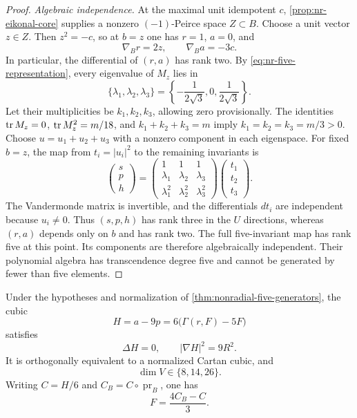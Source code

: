 \begin{proof}
\emph{Algebraic independence.}
At the maximal unit idempotent $c$,
\cref{prop:nr-eikonal-core} supplies a nonzero $(-1)$-Peirce space
$Z\subset B$. Choose a unit vector $z\in Z$. Then $z^2=-c$, so at
$b=z$ one has $r=1$, $a=0$, and
\[
 \nabla_B r=2z,\qquad \nabla_B a=-3c.
\]
In particular, the differential of $(r,a)$ has rank two.
By \eqref{eq:nr-five-representation}, every eigenvalue of $M_z$ lies in
\[
 \{\lambda_1,\lambda_2,\lambda_3\}
   =\left\{-\frac1{2\sqrt3},0,\frac1{2\sqrt3}\right\}.
\]
Let their multiplicities be $k_1,k_2,k_3$, allowing zero provisionally.
The identities $\operatorname{tr} M_z=0$, $\operatorname{tr} M_z^2=m/18$, and
$k_1+k_2+k_3=m$ imply $k_1=k_2=k_3=m/3>0$.
Choose $u=u_1+u_2+u_3$ with a nonzero component in each eigenspace.
For fixed $b=z$, the map from $t_i=|u_i|^2$ to the remaining invariants
is
\[
 \begin{pmatrix}s\\p\\h\end{pmatrix}
 =
 \begin{pmatrix}
  1&1&1\\
  \lambda_1&\lambda_2&\lambda_3\\
  \lambda_1^2&\lambda_2^2&\lambda_3^2
 \end{pmatrix}
 \begin{pmatrix}t_1\\t_2\\t_3\end{pmatrix}.
\]
The Vandermonde matrix is invertible, and the differentials $dt_i$
are independent because $u_i\ne0$. Thus $(s,p,h)$ has rank three
in the $U$ directions, whereas $(r,a)$ depends only on $b$ and has
rank two. The full five-invariant map has rank five at this point.
Its components are therefore algebraically independent. Their
polynomial algebra has transcendence degree five and cannot be
generated by fewer than five elements.
\end{proof}

\begin{corollary}
\label{cor:nr-cartan-dimensions}
Under the hypotheses and normalization of
\cref{thm:nonradial-five-generators}, the cubic
\begin{equation}\label{eq:nr-cartan-reduction}
 H=a-9p=6\bigl(\Gamma(r,F)-5F\bigr)
\end{equation}
satisfies
\[
 \Delta H=0,\qquad |\nabla H|^2=9R^2.
\]
It is orthogonally equivalent to a normalized Cartan cubic, and
\[
 \dim V\in\{8,14,26\}.
\]
Writing $C=H/6$ and $C_B=C\circ\operatorname{pr}_B$, one has
\begin{equation}\label{eq:nr-cartan-reconstruction}
 F=\frac{4C_B-C}{3}.
\end{equation}
\end{corollary}

